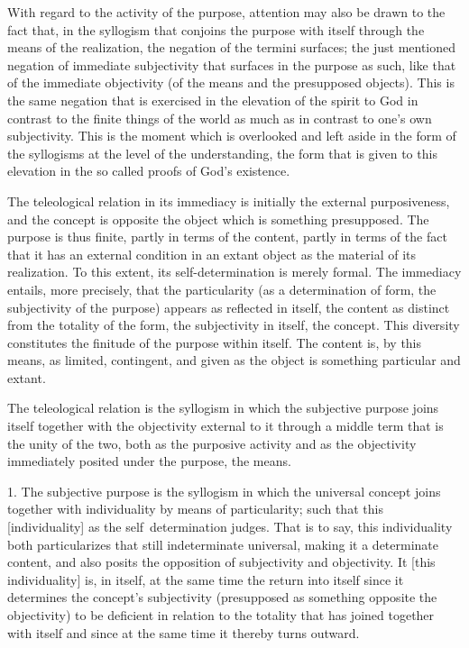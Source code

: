 With regard to the activity of the purpose,
attention may also be drawn to the fact that,
in the syllogism that conjoins the purpose with itself
through the means of the realization,
the negation of the termini surfaces;
the just mentioned negation of immediate subjectivity
that surfaces in the purpose as such,
like that of the immediate objectivity
(of the means and the presupposed objects).
This is the same negation that is exercised
in the elevation of the spirit to God
in contrast to the finite things of the world
as much as in contrast to one's own subjectivity.
This is the moment which is overlooked
and left aside in the form of the syllogisms
at the level of the understanding,
the form that is given to this elevation
in the so called proofs of God's existence.

The teleological relation in its immediacy is initially the external purposiveness,
and the concept is opposite the object which is something presupposed.
The purpose is thus finite, partly in terms of the content,
partly in terms of the fact that it has an external condition
in an extant object as the material of its realization.
To this extent, its self-determination is merely formal.
The immediacy entails, more precisely, that the particularity
(as a determination of form, the subjectivity of the purpose)
appears as reflected in itself, the content as distinct from
the totality of the form, the subjectivity in itself, the concept.
This diversity constitutes the finitude of the purpose within itself.
The content is, by this means, as limited, contingent, and
given as the object is something particular and extant.

The teleological relation is the syllogism
in which the subjective purpose joins itself
together with the objectivity external to it
through a middle term that is the unity of the two,
both as the purposive activity and as the objectivity
immediately posited under the purpose, the means.

1. The subjective purpose is the syllogism in which the universal concept
joins together with individuality by means of particularity;
such that this [individuality] as the self~determination judges.
That is to say, this individuality both particularizes that still indeterminate universal,
making it a determinate content, and also posits the opposition of subjectivity and objectivity.
It [this individuality] is, in itself, at the same time the return
into itself since it determines the concept's subjectivity
(presupposed as something opposite the objectivity)
to be deficient in relation to the totality that has joined together
with itself and since at the same time it thereby turns outward.

